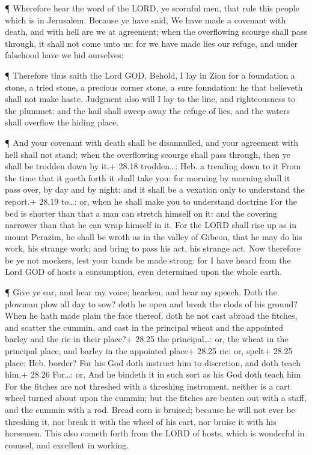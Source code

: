  ¶ Wherefore hear the word of the LORD, ye scornful men,
that rule this people which is in Jerusalem.  Because ye
have said, We have made a covenant with death, and with hell are we at
agreement; when the overflowing scourge shall pass through, it shall not
come unto us: for we have made lies our refuge, and under falsehood have
we hid ourselves:

 ¶ Therefore thus saith the Lord GOD, Behold, I lay in Zion
for a foundation a stone, a tried stone, a precious corner stone, a sure
foundation: he that believeth shall not make haste. 
Judgment also will I lay to the line, and righteousness to the plummet:
and the hail shall sweep away the refuge of lies, and the waters shall
overflow the hiding place.

 ¶ And your covenant with death shall be disannulled, and
your agreement with hell shall not stand; when the overflowing scourge
shall pass through, then ye shall be trodden down by it.+ 28.18
trodden\ldots: Heb. a treading down to it  From the time
that it goeth forth it shall take you: for morning by morning shall it
pass over, by day and by night: and it shall be a vexation only to
understand the report.+ 28.19 to\ldots: or, when he shall make you to
understand doctrine  For the bed is shorter than that a man
can stretch himself on it: and the covering narrower than that he can
wrap himself in it.  For the LORD shall rise up as in mount
Perazim, he shall be wroth as in the valley of Gibeon, that he may do
his work, his strange work; and bring to pass his act, his strange act.
 Now therefore be ye not mockers, lest your bands be made
strong: for I have heard from the Lord GOD of hosts a consumption, even
determined upon the whole earth.

 ¶ Give ye ear, and hear my voice; hearken, and hear my
speech.  Doth the plowman plow all day to sow? doth he open
and break the clods of his ground?  When he hath made plain
the face thereof, doth he not cast abroad the fitches, and scatter the
cummin, and cast in the principal wheat and the appointed barley and the
rie in their place?+ 28.25 the principal\ldots: or, the wheat in the
principal place, and barley in the appointed place+ 28.25 rie: or,
spelt+ 28.25 place: Heb. border?  For his God doth instruct
him to discretion, and doth teach him.+ 28.26 For\ldots: or, And he
bindeth it in such sort as his God doth teach him  For the
fitches are not threshed with a threshing instrument, neither is a cart
wheel turned about upon the cummin; but the fitches are beaten out with
a staff, and the cummin with a rod.  Bread corn is bruised;
because he will not ever be threshing it, nor break it with the wheel of
his cart, nor bruise it with his horsemen.  This also
cometh forth from the LORD of hosts, which is wonderful in counsel, and
excellent in working.

